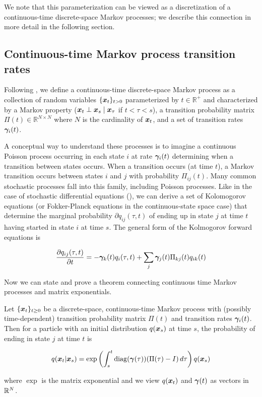We note that this parameterization can be viewed as a discretization of a continuous-time discrete-space Markov processes; we describe this connection in more detail in the following section.


\subsection{Continuous-time Markov process transition rates}
\label{appendix:kolmogorov}

Following \citet{feller1949theory}, we define a continuous-time discrete-space Markov process as a collection of random variables $\{\boldsymbol{x}_t\}_{t>0}$ parameterized by $t\in\mathbb{R}^+$ and characterized by a Markov property ($\boldsymbol{x}_t \perp \boldsymbol{x}_s \mid \boldsymbol{x}_\tau$ if $t < \tau < s$), a transition probability matrix $\Pi(t)\in\mathbb{R}^{N\times N}$ where $N$ is the cardinality of $\boldsymbol{x}_t$, and a set of transition rates $\boldsymbol{\gamma}_i(t)$. 

A conceptual way to understand these processes is to imagine a continuous Poisson process occurring in each state $i$ at rate $\boldsymbol{\gamma}_i(t)$ determining when a transition between states occurs. When a transition occurs (at time $t$), a Markov transition occurs between states $i$ and $j$ with probability $\Pi_{ij}(t)$. Many common stochastic processes fall into this family, including Poisson processes. Like in the case of stochastic differential equations (\citet{song2020_sde}), we can derive a set of Kolomogorov equations (or Fokker-Planck equations in the continuous-state space case) that determine the marginal probability $\partial q_{ij}(\tau, t)$ of ending up in state $j$ at time $t$ having started in state $i$ at time $s$. The general form of the Kolmogorov forward equations is

$$\frac{\partial q_{ij}(\tau, t)}{\partial t} = -\boldsymbol{\gamma}_k(t) q_{i}(\tau, t) + \sum_j \boldsymbol{\gamma}_j(t) \Pi_{kj}(t) q_{ik}(t)$$

Now we can state and prove a theorem connecting continuous time Markov processes and matrix exponentials.

\begin{theorem}
\label{appendix:exponential_theorem}
Let $\{\boldsymbol{x}_t\}_{t\geq 0}$ be a discrete-space, continuous-time Markov process with (possibly time-dependent) transition probability matrix $\Pi(t)$ and transition rates $\boldsymbol{\gamma}_{i}(t)$. Then for a particle with an initial distribution $q(\boldsymbol{x}_s)$ at time $s$, the probability of ending in state $j$ at time $t$ is

$$q(\boldsymbol{x}_t | \boldsymbol{x}_s) = \exp\left(\int_s^t \operatorname{diag}(\boldsymbol{\gamma}(\tau)) (\Pi(\tau)-I)\, d\tau \right) q(\boldsymbol{x}_s)$$

where $\exp$ is the matrix exponential and we view $q(\boldsymbol{x}_t)$ and $\boldsymbol{\gamma}(t)$ as vectors in $\mathbb{R}^N$.
\end{theorem}


